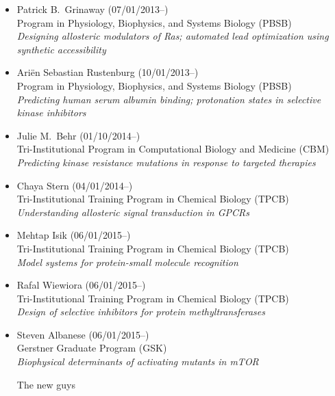 \documentclass[10pt]{article}
\begin{document}
\begin{itemize}
  \item Patrick B.~Grinaway (07/01/2013--)\\
  Program in Physiology, Biophysics, and Systems Biology (PBSB)\\
  \emph{Designing allosteric modulators of Ras; automated lead optimization using synthetic accessibility}

  \item Ari\"{e}n Sebastian Rustenburg (10/01/2013--)\\
  Program in Physiology, Biophysics, and Systems Biology (PBSB)\\
  \emph{Predicting human serum albumin binding; protonation states in selective kinase inhibitors}

  \item Julie M.~Behr (01/10/2014--)\\
  Tri-Institutional Program in Computational Biology and Medicine (CBM)\\
  \emph{Predicting kinase resistance mutations in response to targeted therapies} 
  
  \item Chaya Stern (04/01/2014--)\\
  Tri-Institutional Training Program in Chemical Biology (TPCB)\\
  \emph{Understanding allosteric signal transduction in GPCRs}
  
  \item Mehtap Isik (06/01/2015--)\\
  Tri-Institutional Training Program in Chemical Biology (TPCB)\\
  \emph{Model systems for protein-small molecule recognition}
  
  \item Rafal Wiewiora (06/01/2015--)\\
  Tri-Institutional Training Program in Chemical Biology (TPCB)\\
  \emph{Design of selective inhibitors for protein methyltransferases}
  
  \item Steven Albanese (06/01/2015--)\\
  Gerstner Graduate Program (GSK)\\
  \emph{Biophysical determinants of activating mutants in mTOR}
  
  \color{red}
  The new guys
  \color{black}
  
\end{itemize}
\end{document}
